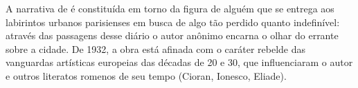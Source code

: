 \hspace*{-7cm}\hrulefill\hspace*{-7cm}

\medskip

\noindent{}A narrativa de {} é constituída em torno da figura de alguém que se entrega aos labirintos urbanos parisienses em busca de algo tão perdido quanto indefinível: através das passagens desse diário o autor anônimo encarna o olhar do errante sobre a cidade. De 1932, a obra está afinada com o caráter rebelde das vanguardas artísticas europeias das décadas de 20 e 30, que influenciaram o autor e outros literatos romenos de seu tempo (Cioran, Ionesco, Eliade).

\vfill

\hspace*{-.4cm}\begin{minipage}[c]{1\linewidth}
\small{
{}}
\end{minipage}

\pagebreak
